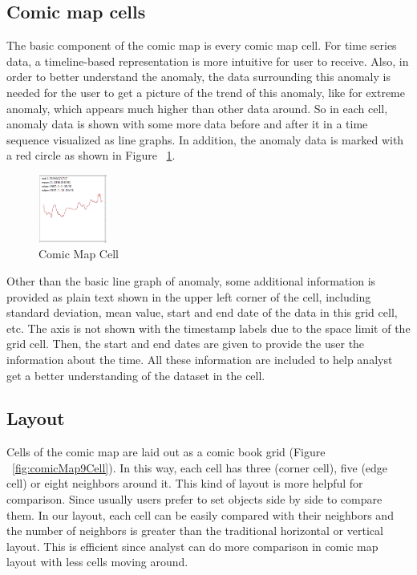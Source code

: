 \documentclass{vgtc}                          %
\begin{document}
\subsection{Comic map cells}

The basic component of the comic map is every comic map cell. For time series data, a timeline-based representation is more intuitive for user to receive. Also, in order to better understand the anomaly, the data surrounding this anomaly is needed for the user to get a picture of the trend of this anomaly, like for extreme anomaly, which appears much higher than other data around. So in each cell, anomaly data is shown with some more data before and after it in a time sequence visualized as line graphs. In addition, the anomaly data is marked with a red circle as shown in Figure ~\ref{fig:onecell}.

\begin{figure}[htb]
	\centering
	\includegraphics[width=0.20\textwidth]{onecell.jpg}
	\caption{Comic Map Cell}
	\label{fig:onecell}
\end{figure}

Other than the basic line graph of anomaly, some additional information is provided as plain text shown in the upper left corner of the cell, including standard deviation, mean value, start and end date of the data in this grid cell, etc. The axis is not shown with the timestamp labels due to the space limit of the grid cell. Then, the start and end dates are given to provide the user the information about the time. All these information are included to help analyst get a better understanding of the dataset in the cell.

\subsection{Layout}
Cells of the comic map are laid out as a comic book grid (Figure ~\ref{fig:comicMap9Cell}). In this way, each cell has three (corner cell), five (edge cell) or eight neighbors around it. This kind of layout is more helpful for comparison. Since usually users prefer to set objects side by side to compare them. In our layout, each cell can be easily compared with their neighbors and the number of neighbors is greater than the traditional horizontal or vertical layout. This is efficient since analyst can do more comparison in comic map layout with less cells moving around.
\end{document}
